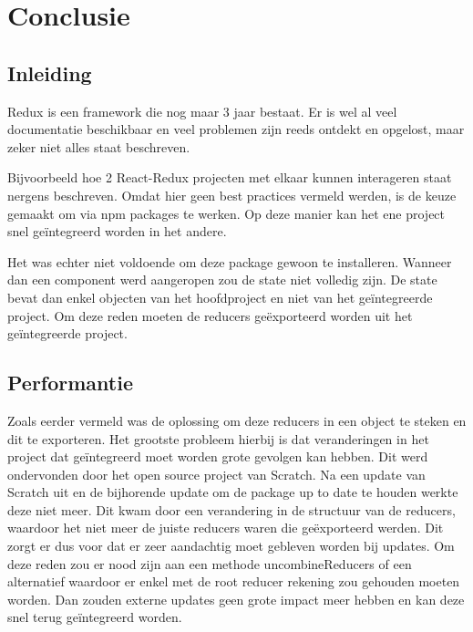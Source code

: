
\chapter{Conclusie}
\label{ch:conclusie}


\section{Inleiding}
Redux is een framework die nog maar 3 jaar bestaat. Er is wel al veel documentatie beschikbaar en veel problemen zijn reeds ontdekt en opgelost, maar zeker niet alles staat beschreven. 

Bijvoorbeeld hoe 2 React-Redux projecten met elkaar kunnen interageren staat nergens beschreven. Omdat hier geen best practices vermeld werden, is de keuze gemaakt om via npm packages te werken. Op deze manier kan het ene project snel geïntegreerd worden in het andere. 

Het was echter niet voldoende om deze package gewoon te installeren. Wanneer dan een component werd aangeropen zou de state niet volledig zijn. De state bevat dan enkel objecten van het hoofdproject en niet van het geïntegreerde project. Om deze reden moeten de reducers geëxporteerd worden uit het geïntegreerde project. 

\section{Performantie}
Zoals eerder vermeld was de oplossing om deze reducers in een object te steken en dit te exporteren. Het grootste probleem hierbij is dat veranderingen in het project dat geïntegreerd moet worden grote gevolgen kan hebben. Dit werd ondervonden door het open source project van Scratch. Na een update van Scratch uit en de bijhorende update om de package up to date te houden werkte deze niet meer. Dit kwam door een verandering in de structuur van de reducers, waardoor het niet meer de juiste reducers waren die geëxporteerd werden. Dit zorgt er dus voor dat er zeer aandachtig moet gebleven worden bij updates. Om deze reden zou er nood zijn aan een methode uncombineReducers of een alternatief waardoor er enkel met de root reducer rekening zou gehouden moeten worden. Dan zouden externe updates geen grote impact meer hebben en kan deze snel terug geïntegreerd worden.

